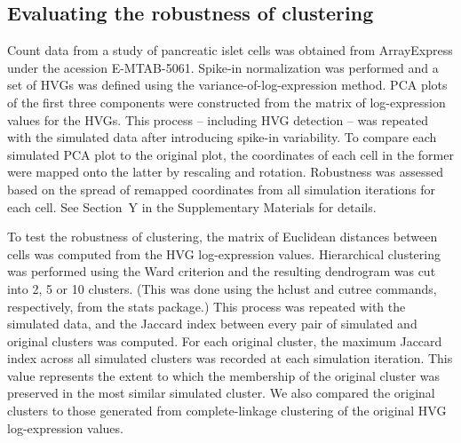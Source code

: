 \documentclass{article}
\begin{document}
\subsection{Evaluating the robustness of clustering}
Count data from a study of pancreatic islet cells \cite{someone} was obtained from ArrayExpress under the acession E-MTAB-5061.
Spike-in normalization was performed and a set of HVGs was defined using the variance-of-log-expression method.
PCA plots of the first three components were constructed from the matrix of log-expression values for the HVGs.
This process -- including HVG detection -- was repeated with the simulated data after introducing spike-in variability.
To compare each simulated PCA plot to the original plot, the coordinates of each cell in the former were mapped onto the latter by rescaling and rotation.
Robustness was assessed based on the spread of remapped coordinates from all simulation iterations for each cell.
See Section~Y in the Supplementary Materials for details.

To test the robustness of clustering, the matrix of Euclidean distances between cells was computed from the HVG log-expression values. 
Hierarchical clustering was performed using the Ward criterion and the resulting dendrogram was cut into 2, 5 or 10 clusters.
(This was done using the hclust and cutree commands, respectively, from the stats package.)
This process was repeated with the simulated data, and the Jaccard index between every pair of simulated and original clusters was computed.
For each original cluster, the maximum Jaccard index across all simulated clusters was recorded at each simulation iteration.
This value represents the extent to which the membership of the original cluster was preserved in the most similar simulated cluster.
We also compared the original clusters to those generated from complete-linkage clustering of the original HVG log-expression values.

{\small


}
\end{document}
